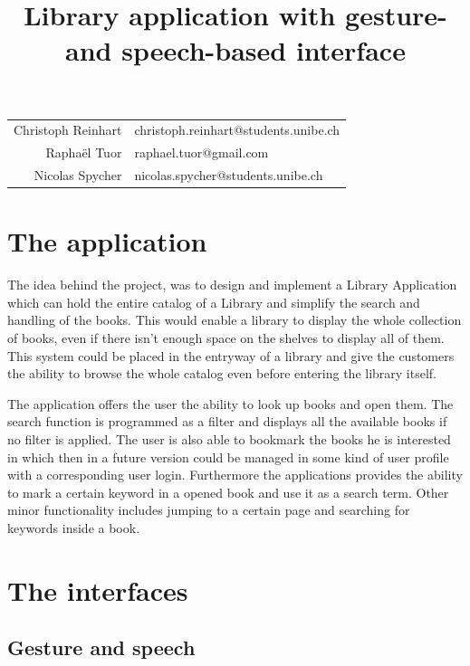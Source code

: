 \documentclass[a4paper, 10pt]{article}
\begin{document}
	\title{Library application with gesture- and speech-based interface}
	\maketitle
	
	\begin{tabular}{rl}
		Christoph Reinhart  & christoph.reinhart@students.unibe.ch\\
		Raphaël Tuor  & raphael.tuor@gmail.com\\
		Nicolas Spycher & nicolas.spycher@students.unibe.ch
	\end{tabular}
	\newpage
	
	\tableofcontents
	\listoffigures
	\listoftables
	
	\newpage	
	\section{The application}
	
	\par{The idea behind the project, was to design and implement a Library Application which can hold the entire catalog of a Library and simplify the search and handling of the books. This would enable a library to display the whole collection of books, even if there isn't enough space on the shelves to display all of them. This system could be placed in the entryway of a library and give the customers the ability to browse the whole catalog even before entering the library itself.}
	\par{The application offers the user the ability to look up books and open them. The search function is programmed as a filter and displays all the available books if no filter is applied. The user is also able to bookmark the books he is interested in which then in a future version could be managed in some kind of user profile with a corresponding user login. Furthermore the applications provides the ability to mark a certain keyword in a opened book and use it as a search term. Other minor functionality includes jumping to a certain page and searching for keywords inside a book.}
	
	
	\section{The interfaces}
	
	\subsection{Gesture and speech}
	
\end{document}
